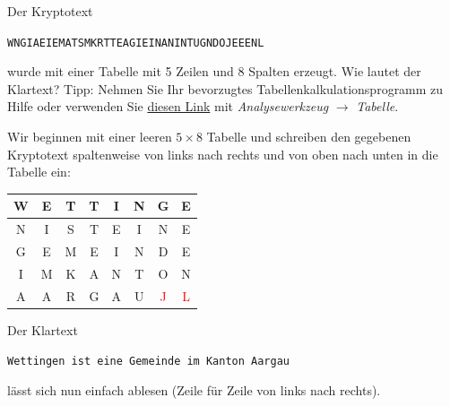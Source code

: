 \begin{myexercise}
	Der Kryptotext
	\begin{center}
		\texttt{WNGIAEIEMATSMKRTTEAGIEINANINTUGNDOJEEENL}
	\end{center}
	wurde mit einer Tabelle mit 5 Zeilen und 8 Spalten erzeugt. Wie lautet der Klartext? Tipp: Nehmen Sie Ihr bevorzugtes Tabellenkalkulationsprogramm zu Hilfe oder verwenden Sie \href{https://cryptbreaker.marcwidmer.xyz/solve}{diesen Link} mit \emph{Analysewerkzeug} $\rightarrow$ \emph{Tabelle}.
	\begin{myanswer}

		Wir beginnen mit einer leeren $5\times 8$ Tabelle und schreiben den gegebenen Kryptotext spaltenweise von links nach rechts und von oben nach unten in die Tabelle ein:
		\begin{table}[H]
			\centering
			\begin{tabular}{*{8}{C|}} %
				W & E & T & T & I & N & G                  & E                  \\ \hline
				N & I & S & T & E & I & N                  & E                  \\ \hline
				G & E & M & E & I & N & D                  & E                  \\ \hline
				I & M & K & A & N & T & O                  & N                  \\ \hline
				A & A & R & G & A & U & \textcolor{Red}{J} & \textcolor{Red}{L}
			\end{tabular}
		\end{table}
		Der Klartext
		\begin{center}
			\texttt{Wettingen ist eine Gemeinde im Kanton Aargau}
		\end{center}
		lässt sich nun einfach ablesen (Zeile für Zeile von links nach rechts).
	\end{myanswer}
\end{myexercise}

